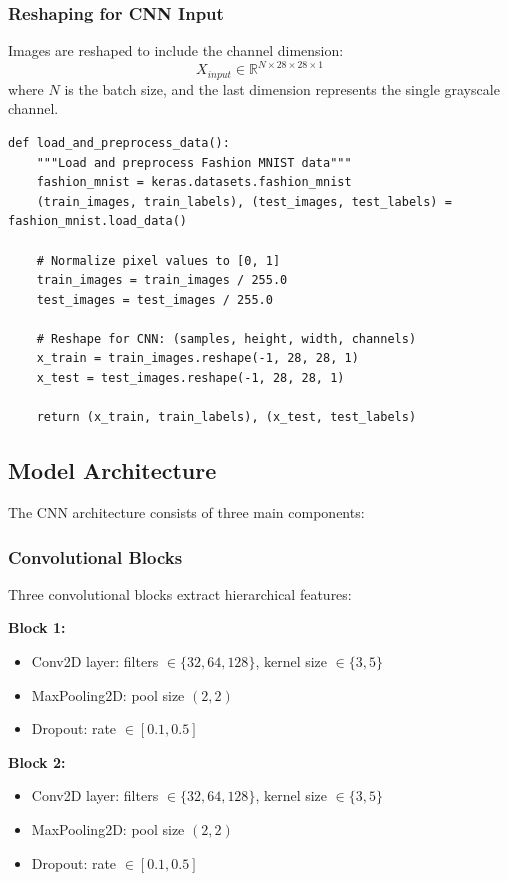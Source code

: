 \documentclass[12pt,a4paper]{article}
\begin{document}
\subsubsection{Reshaping for CNN Input}
Images are reshaped to include the channel dimension:
\begin{equation}
X_{input} \in \mathbb{R}^{N \times 28 \times 28 \times 1}
\end{equation}
where $N$ is the batch size, and the last dimension represents the single grayscale channel.

\begin{lstlisting}[caption={Data Preprocessing Implementation}]
def load_and_preprocess_data():
    """Load and preprocess Fashion MNIST data"""
    fashion_mnist = keras.datasets.fashion_mnist
    (train_images, train_labels), (test_images, test_labels) = fashion_mnist.load_data()
    
    # Normalize pixel values to [0, 1]
    train_images = train_images / 255.0
    test_images = test_images / 255.0
    
    # Reshape for CNN: (samples, height, width, channels)
    x_train = train_images.reshape(-1, 28, 28, 1)
    x_test = test_images.reshape(-1, 28, 28, 1)
    
    return (x_train, train_labels), (x_test, test_labels)
\end{lstlisting}

\subsection{Model Architecture}

The CNN architecture consists of three main components:

\subsubsection{Convolutional Blocks}
Three convolutional blocks extract hierarchical features:

\textbf{Block 1:}
\begin{itemize}
    \item Conv2D layer: filters $\in \{32, 64, 128\}$, kernel size $\in \{3, 5\}$
    \item MaxPooling2D: pool size $(2, 2)$
    \item Dropout: rate $\in [0.1, 0.5]$
\end{itemize}

\textbf{Block 2:}
\begin{itemize}
    \item Conv2D layer: filters $\in \{32, 64, 128\}$, kernel size $\in \{3, 5\}$
    \item MaxPooling2D: pool size $(2, 2)$
    \item Dropout: rate $\in [0.1, 0.5]$
\end{itemize}
\end{document}

